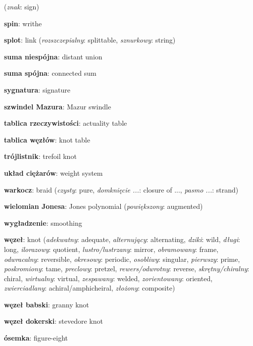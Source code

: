(\emph{znak}: sign)
\item \textbf{spin}: writhe
\item \textbf{splot}: link
(\emph{rozszczepialny}: splittable, \emph{sznurkowy}: string)
\item \textbf{suma niespójna}: distant union
\item \textbf{suma spójna}: connected sum
\item \textbf{sygnatura}: signature
\item \textbf{szwindel Mazura}: Mazur swindle
\item \textbf{tablica rzeczywistości}: actuality table
\item \textbf{tablica węzłów}: knot table
\item \textbf{trójlistnik}: trefoil knot
\item \textbf{układ ciężarów}: weight system
\item \textbf{warkocz}: braid
(\emph{czysty}: pure, \emph{domknięcie ...}: closure of ..., \emph{pasmo ...}: strand)
\item \textbf{wielomian Jonesa}: Jones polynomial
(\emph{powiększony}: augmented)
\item \textbf{wygładzenie}: smoothing
\item \textbf{węzeł}: knot
(\emph{adekwatny}: adequate, \emph{alternujący}: alternating, \emph{dziki}: wild, \emph{długi}: long, \emph{ilorazowy}: quotient, \emph{lustro/lustrzany}: mirror, \emph{obramowany}: frame, \emph{odwracalny}: reversible, \emph{okresowy}: periodic, \emph{osobliwy}: singular, \emph{pierwszy}: prime, \emph{poskromiony}: tame, \emph{preclowy}: pretzel, \emph{rewers/odwrotny}: reverse, \emph{skrętny/chiralny}: chiral, \emph{wirtualny}: virtual, \emph{zespawany}: welded, \emph{zorientowany}: oriented, \emph{zwierciadlany}: achiral/amphicheiral, \emph{złożony}: composite)
\item \textbf{węzeł babski}: granny knot
\item \textbf{węzeł dokerski}: stevedore knot
\item \textbf{ósemka}: figure-eight
